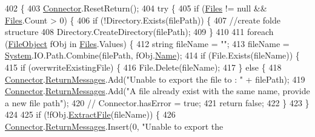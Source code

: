 \begin{DoxyCode}
402                                                                          \{
403         \mbox{\hyperlink{class_connector}{Connector}}.ResetReturn();
404         \textcolor{keywordflow}{try} \{
405             \textcolor{keywordflow}{if} (\mbox{\hyperlink{class_document_object_afe6bcf5175607f91dde768491f23a0a4}{Files}} != null && \mbox{\hyperlink{class_document_object_afe6bcf5175607f91dde768491f23a0a4}{Files}}.Count > 0) \{
406                 \textcolor{keywordflow}{if} (!Directory.Exists(filePath)) \{
407                     \textcolor{comment}{//create folde structure}
408                     Directory.CreateDirectory(filePath);
409                 \}
410 
411                 \textcolor{keywordflow}{foreach} (\mbox{\hyperlink{class_file_object}{FileObject}} fObj \textcolor{keywordflow}{in} \mbox{\hyperlink{class_document_object_afe6bcf5175607f91dde768491f23a0a4}{Files}}.Values) \{
412                     \textcolor{keywordtype}{string} fileName = \textcolor{stringliteral}{""};
413                     fileName = \mbox{\hyperlink{namespace_system}{System}}.IO.Path.Combine(filePath, fObj.\mbox{\hyperlink{class_file_object_a9d47aff166393cb47490da2661576d62}{Name}});
414                     \textcolor{keywordflow}{if} (File.Exists(fileName)) \{
415                         \textcolor{keywordflow}{if} (overwriteExistingFile) \{
416                             File.Delete(fileName);
417                         \} \textcolor{keywordflow}{else} \{
418                             \mbox{\hyperlink{class_connector}{Connector}}.\mbox{\hyperlink{class_connector_a1ed422674b344524fd77998dcf6a9ba6}{ReturnMessages}}.Add(\textcolor{stringliteral}{"Unable to export the file
       to : "} + filePath);
419                             \mbox{\hyperlink{class_connector}{Connector}}.\mbox{\hyperlink{class_connector_a1ed422674b344524fd77998dcf6a9ba6}{ReturnMessages}}.Add(\textcolor{stringliteral}{"A file already exist with
       the same name, provide a new file path"});
420                             \textcolor{comment}{// Connector.hasError = true;}
421                             \textcolor{keywordflow}{return} \textcolor{keyword}{false};
422                         \}
423                     \}
424 
425                     \textcolor{keywordflow}{if} (!fObj.\mbox{\hyperlink{class_file_object_ae21fac09c5ab2f9fac96a3f084cb9ddc}{ExtractFile}}(fileName)) \{
426                         \mbox{\hyperlink{class_connector}{Connector}}.\mbox{\hyperlink{class_connector_a1ed422674b344524fd77998dcf6a9ba6}{ReturnMessages}}.Insert(0, \textcolor{stringliteral}{"Unable to export the
}
\end{DoxyCode}
